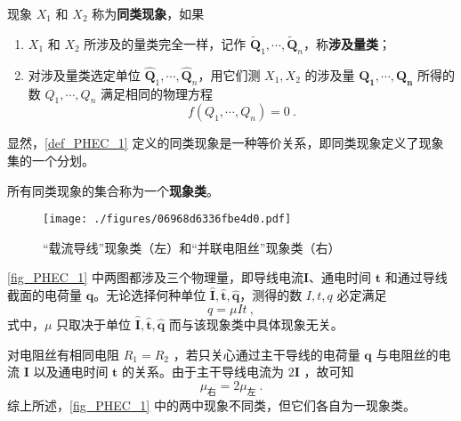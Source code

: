 \begin{definition}{}\label{def_PHEC_1}
现象 $X_1$ 和 $X_2$ 称为\textbf{同类现象}，如果
\begin{enumerate}
\item $X_1$ 和 $X_2$ 所涉及的量类完全一样，记作 $\tilde{\boldsymbol{Q}}_1,\cdots,\tilde{\boldsymbol{Q}}_n$，称\textbf{涉及量类}； 
\item 对涉及量类选定单位 $\hat{\boldsymbol{Q}}_1,\cdots,\hat{\boldsymbol{Q}}_n$，用它们测 $X_1,X_2$ 的涉及量 $\boldsymbol{Q_1},\cdots ,\boldsymbol{Q_n}$ 所得的数 $Q_1,\cdots,Q_n$ 满足相同的物理方程
\begin{equation}
f(Q_1,\cdots,Q_n)=0~.
\end{equation}
\end{enumerate}
\end{definition}
显然，\autoref{def_PHEC_1} 定义的同类现象是一种等价关系，即同类现象定义了现象集的一个分划。
\begin{definition}{}
所有同类现象的集合称为一个\textbf{现象类}。
\end{definition}
\begin{example}{}
\begin{figure}[ht]
\centering
\texttt{[image: ./figures/06968d6336fbe4d0.pdf]}
\caption{“载流导线”现象类（左）和“并联电阻丝”现象类（右）} \label{fig_PHEC_1}
\end{figure}
\autoref{fig_PHEC_1} 中两图都涉及三个物理量，即导线电流$\boldsymbol{I}$、通电时间 $\boldsymbol{t}$ 和通过导线截面的电荷量 $\boldsymbol{q}$。无论选择何种单位 $\hat{\boldsymbol{I}},\hat{\boldsymbol{t}},\hat{\boldsymbol{q}}$，测得的数 $I,t,q$ 必定满足
\begin{equation}
q=\mu It~,
\end{equation}
式中，$\mu$ 只取决于单位 $\hat{\boldsymbol{I}},\hat{\boldsymbol{t}},\hat{\boldsymbol{q}}$ 而与该现象类中具体现象无关。

对电阻丝有相同电阻 $R_1=R_2$ ，若只关心通过主干导线的电荷量 $\boldsymbol{q}$ 与电阻丝的电流 $\boldsymbol{I}$ 以及通电时间 $\boldsymbol{t}$ 的关系。由于主干导线电流为 $2\boldsymbol{I}$ ，故可知 
\begin{equation}
\mu_{\text{右}}=2\mu_{\text{左}}~.
\end{equation}
综上所述，\autoref{fig_PHEC_1} 中的两中现象不同类，但它们各自为一现象类。

\end{example}